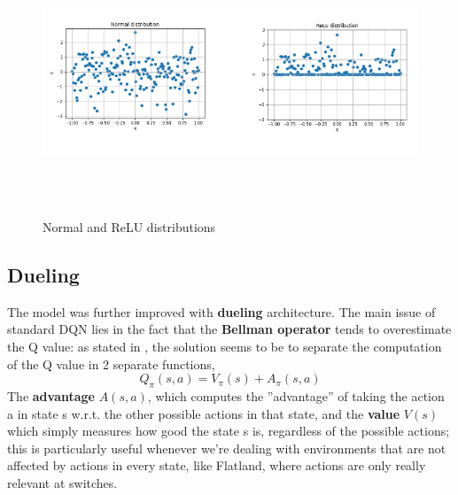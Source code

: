 \begin{itemize}
\begin{figure}[H]
\includegraphics[height=80mm, width=140mm, scale=0.5]{chapters/relu_dist.png}
\centering
\caption{Normal and ReLU distributions}
\label{fig:s3} 
\end{figure}
\end{itemize}

\subsection{Dueling}

The model was further improved with \textbf{dueling} architecture. The main issue of standard DQN lies in the fact that the \textbf{Bellman operator} tends to overestimate the Q value: as stated in \cite{dueling}, the solution seems to be to separate the computation of the Q value in 2 separate functions, $$Q_{\pi}(s,a) = V_{\pi}(s) + A_{\pi}(s,a) $$ The \textbf{advantage} $A(s,a)$, which computes the  ''advantage'' of taking the action a in state s w.r.t. the other possible actions in that state, and the \textbf{value} $V(s)$ which simply measures how good the state s is, regardless of the possible actions; this is particularly useful whenever we're dealing with environments that are not affected by actions in every state, like Flatland, where actions are only really relevant at switches.

